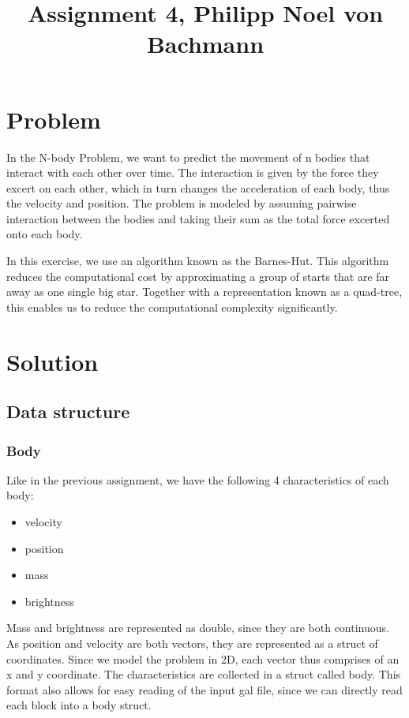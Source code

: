 \documentclass[a4paper]{scrartcl}
\title{Assignment 4, Philipp Noel von Bachmann}
\begin{document}
\maketitle

\section{Problem}
    In the N-body Problem, we want to predict the movement of n bodies that
    interact with each other over time. The interaction is given by the force
    they excert on each other, which in turn changes the acceleration of each
    body, thus the velocity and position. The problem is modeled by assuming
    pairwise interaction between the bodies and taking their sum as the total
    force excerted onto each body.

    In this exercise, we use an algorithm known as the Barnes-Hut. This
    algorithm reduces the computational cost by approximating a group of starts
    that are far away as one single big star. Together with a representation
    known as a quad-tree, this enables us to reduce the computational complexity
    significantly.

\section{Solution}
    \subsection{Data structure}
        \subsubsection{Body}
            Like in the previous assignment, we have the following 4 characteristics of each body:
            \begin{itemize}
                \item velocity
                \item position
                \item mass
                \item brightness
            \end{itemize}
            Mass and brightness are represented as double, since they are both
            continuous. As position and velocity are both vectors, they are
            represented as a struct of coordinates. Since we model the problem in
            2D, each vector thus comprises of an x and y coordinate. The
            characteristics are collected in a struct called body. This format
            also allows for easy reading of the input gal file, since we can
            directly read each block into a body struct.
\end{document}
